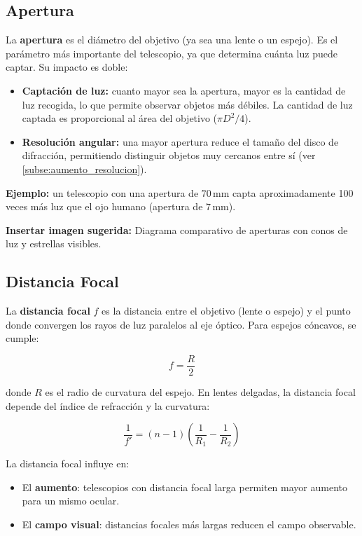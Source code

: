 \subsection{Apertura}
\label{subsec:apertura}

La \textbf{apertura} es el diámetro del objetivo (ya sea una lente o un espejo). Es el parámetro más importante del telescopio, ya que determina cuánta luz puede captar. Su impacto es doble:

\begin{itemize}
	\item \textbf{Captación de luz:} cuanto mayor sea la apertura, mayor es la cantidad de luz recogida, lo que permite observar objetos más débiles. La cantidad de luz captada es proporcional al área del objetivo ($\pi D^2/4$).
	\item \textbf{Resolución angular:} una mayor apertura reduce el tamaño del disco de difracción, permitiendo distinguir objetos muy cercanos entre sí (ver \ref{subse:aumento_resolucion}).
\end{itemize}

\textbf{Ejemplo:} un telescopio con una apertura de $70\,\mathrm{mm}$ capta aproximadamente 100 veces más luz que el ojo humano (apertura de $7\,\mathrm{mm}$).

\vspace{0.3cm}
\textbf{Insertar imagen sugerida:} Diagrama comparativo de aperturas con conos de luz y estrellas visibles.

\subsection{Distancia Focal}
\label{subsec:dist_focal}

La \textbf{distancia focal} $f$ es la distancia entre el objetivo (lente o espejo) y el punto donde convergen los rayos de luz paralelos al eje óptico. Para espejos cóncavos, se cumple:

\[
f = \frac{R}{2}
\]

donde $R$ es el radio de curvatura del espejo. En lentes delgadas, la distancia focal depende del índice de refracción y la curvatura:

\[
\frac{1}{f'} = (n - 1) \left( \frac{1}{R_1} - \frac{1}{R_2} \right)
\]

La distancia focal influye en:

\begin{itemize}
	\item El \textbf{aumento}: telescopios con distancia focal larga permiten mayor aumento para un mismo ocular.
	\item El \textbf{campo visual}: distancias focales más largas reducen el campo observable.
\end{itemize}

